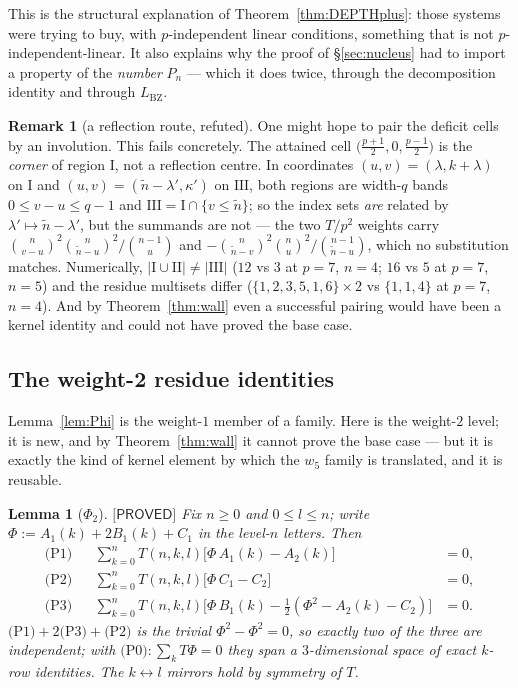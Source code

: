 \documentclass[11pt,reqno]{amsart}
\theoremstyle{plain}
\newtheorem{lemma}[theorem]{Lemma}
\theoremstyle{definition}
\newtheorem{remark}[theorem]{Remark}
\theoremstyle{remark}
\numberwithin{equation}{section}
\newcommand{\LBZ}{L_{\mathrm{BZ}}}
\newcommand{\wfive}{w_5}
\newcommand{\PROVED}{\textsf{[PROVED]}}
\begin{document}
This is the structural explanation of Theorem~\ref{thm:DEPTHplus}: those systems were trying to
buy, with $p$-independent linear conditions, something that is not $p$-independent-linear. It
also explains why the proof of \S\ref{sec:nucleus} had to import a property of the
\emph{number} $P_n$ --- which it does twice, through the decomposition identity and through
$\LBZ$.

\begin{remark}[a reflection route, refuted]
One might hope to pair the deficit cells by an involution. This fails concretely. The attained
cell $\bigl(\tfrac{p+1}{2},0,\tfrac{p-1}{2}\bigr)$ is the \emph{corner} of region $\mathrm I$,
not a reflection centre. In coordinates $(u,v)=(\lambda,k+\lambda)$ on $\mathrm I$ and
$(u,v)=(\tilde n-\lambda',\kappa')$ on $\mathrm{III}$, both regions are width-$q$ bands
$0\le v-u\le q-1$ and $\mathrm{III}=\mathrm I\cap\{v\le\tilde n\}$; so the index sets \emph{are}
related by $\lambda'\mapsto\tilde n-\lambda'$, but the summands are not --- the two $T/p^2$
weights carry $\binom n{v-u}^2\binom n{\tilde n-u}^2/\binom{n-1}{u}$ and
$-\binom n{\tilde n-v}^2\binom nu^2/\binom{n-1}{\tilde n-u}$, which no substitution matches.
Numerically, $|\mathrm I\cup\mathrm{II}|\ne|\mathrm{III}|$ ($12$ vs $3$ at $p=7$, $n=4$; $16$
vs $5$ at $p=7$, $n=5$) and the residue multisets differ ($\{1,2,3,5,1,6\}\times2$ vs
$\{1,1,4\}$ at $p=7$, $n=4$). And by Theorem~\ref{thm:wall} even a successful pairing would
have been a kernel identity and could not have proved the base case.
\end{remark}

\subsection{The weight-2 residue identities}

Lemma~\ref{lem:Phi} is the weight-$1$ member of a family. Here is the weight-$2$ level; it is
new, and by Theorem~\ref{thm:wall} it cannot prove the base case --- but it is exactly the kind
of kernel element by which the $\wfive$ family is translated, and it is reusable.

\begin{lemma}[$\Phi_2$]\label{lem:Phi2}
$\PROVED$ Fix $n\ge0$ and $0\le l\le n$; write $\Phi:=A_1(k)+2B_1(k)+C_1$ in the level-$n$
letters. Then
\[
\begin{aligned}
\text{(P1)}&& \sum_{k=0}^{n}T(n,k,l)\bigl[\Phi\,A_1(k)-A_2(k)\bigr]&=0,\\
\text{(P2)}&& \sum_{k=0}^{n}T(n,k,l)\bigl[\Phi\,C_1-C_2\bigr]&=0,\\
\text{(P3)}&& \sum_{k=0}^{n}T(n,k,l)\bigl[\Phi\,B_1(k)-\tfrac12(\Phi^2-A_2(k)-C_2)\bigr]&=0 .
\end{aligned}
\]
$\text{(P1)}+2\text{(P3)}+\text{(P2)}$ is the trivial $\Phi^2-\Phi^2=0$, so exactly two of the
three are independent; with $\text{(P0)}:\sum_kT\Phi=0$ they span a $3$-dimensional space of
exact $k$-row identities. The $k\leftrightarrow l$ mirrors hold by symmetry of $T$.
\end{lemma}
\end{document}
